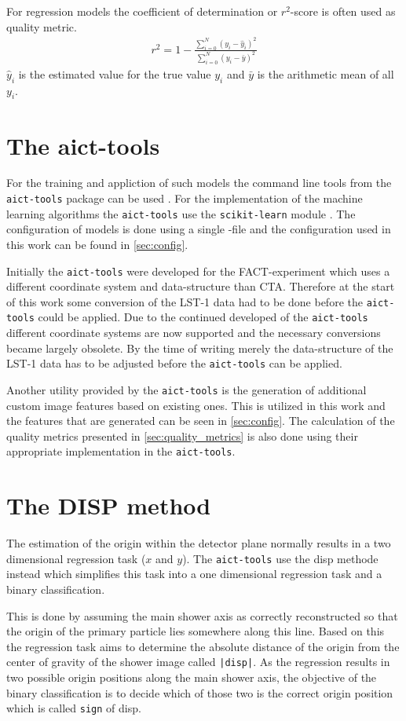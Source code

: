 For regression models the coefficient of determination or $r^2$-score is often used as quality metric.
\begin{align}
    r^2 = 1 - \frac{\sum_{i = 0}^N (y_i - \hat{y}_i)^2}{\sum_{i = 0}^N (y_i - \bar{y})^2}
\end{align}
$\hat{y}_i$ is the estimated value for the true value $y_i$ and $\bar{y}$ is the arithmetic mean of all $y_i$.


\section{The aict-tools}
For the training and appliction of such models the command line tools from the \texttt{aict-tools} package can be used \cite{aict-tools}. 
For the implementation of the machine learning algorithms the \texttt{aict-tools} use the \texttt{scikit-learn} module \cite{scikit-learn}.
The configuration of models is done using a single -file and the configuration used in this work can be found in \autoref{sec:config}.

Initially the \texttt{aict-tools} were developed for the FACT-experiment which uses a different coordinate system and data-structure than CTA.
Therefore at the start of this work some conversion of the LST-1 data had to be done before the \texttt{aict-tools} could be applied.
Due to the continued developed of the \texttt{aict-tools} different coordinate systems are now supported and the necessary conversions became largely obsolete.
By the time of writing merely the data-structure of the LST-1 data has to be adjusted before the \texttt{aict-tools} can be applied.

Another utility provided by the \texttt{aict-tools} is the generation of additional custom image features based on existing ones.
This is utilized in this work and the features that are generated can be seen in \autoref{sec:config}. 
The calculation of the quality metrics presented in \autoref{sec:quality_metrics} is also done using their appropriate implementation in the \texttt{aict-tools}.


\section{The DISP method}
The estimation of the origin within the detector plane normally results in a two dimensional regression task ($x$ and $y$).
The \texttt{aict-tools} use the disp methode instead which simplifies this task into a one dimensional regression task and a binary classification.

This is done by assuming the main shower axis as correctly reconstructed so that the origin of the primary particle lies somewhere along this line.
Based on this the regression task aims to determine the absolute distance of the origin from the center of gravity of the shower image called \texttt{|disp|}.
As the regression results in two possible origin positions along the main shower axis, the objective of the binary classification is to decide which
of those two is the correct origin position which is called \texttt{sign} of disp.
